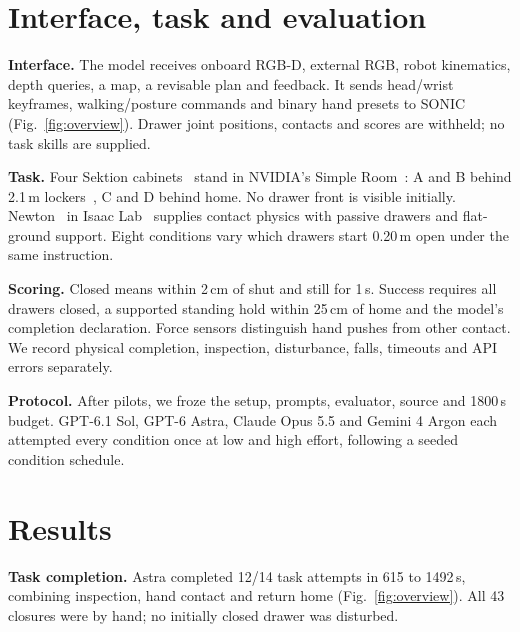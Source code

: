 \documentclass{article}
\begin{document}
\section{Interface, task and evaluation}
\textbf{Interface.} The model receives onboard RGB-D, external RGB, robot
kinematics, depth queries, a map, a revisable plan and feedback. It sends
head/wrist keyframes, walking/posture commands and binary hand presets to SONIC
(Fig.~\ref{fig:overview}). Drawer joint positions, contacts and scores are
withheld; no task skills are supplied.

\textbf{Task.} Four Sektion cabinets~\citep{isaaclab2026cabinet} stand in
NVIDIA's Simple Room~\citep{nvidia2026warehouseassets,nvidia2026assetlicense}:
A and B behind 2.1\,m lockers~\citep{nvidia2026simready}, C and D behind home.
No drawer front is visible initially. Newton~\citep{newton2025} in
Isaac Lab~\citep{isaaclab2025} supplies contact physics with passive drawers
and flat-ground support. Eight conditions vary which drawers start 0.20\,m open under the same
instruction.

\textbf{Scoring.} Closed means within 2\,cm of shut and still for 1\,s.
Success requires all drawers closed, a supported standing hold within 25\,cm
of home and the model's completion declaration. Force sensors distinguish hand
pushes from other contact. We record physical completion, inspection,
disturbance, falls, timeouts and API errors separately.

\textbf{Protocol.} After pilots, we froze the setup, prompts, evaluator, source
and 1800\,s budget. GPT-6.1 Sol, GPT-6 Astra, Claude Opus 5.5 and Gemini 4 Argon
each attempted every condition once at low and high effort, following a seeded
condition schedule.

\section{Results}


\begin{table}[t]
  \centering
  \small
  \setlength{\tabcolsep}{3pt}
  
  \caption{Seven scheduled task attempts per row; all-closed controls are separate.
  Other counts use completed episodes. \emph{Physical}: closed, home, upright;
  \emph{Seen}: all fronts viewed; \emph{False}: declarations without physical
  completion. Pairs show all / successful attempts: mean cost and episode time,
  median per-attempt median decision latency. Costs use published
  rates~\citep{openai2026pricing,anthropic2026pricing,google2026pricing}.
  $^{*}$: no successful attempt observed. API-error starts stay in denominators.}
  \label{tab:results}
\end{table}
\textbf{Task completion.} Astra completed 12/14 task attempts in 615 to
1492\,s, combining inspection, hand contact and return home
(Fig.~\ref{fig:overview}). All 43 closures were by hand; no initially closed
drawer was disturbed.
\end{document}
